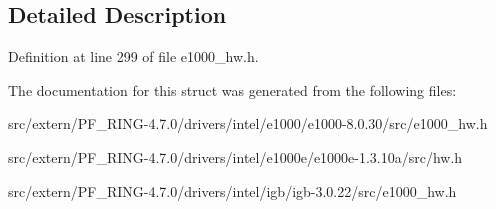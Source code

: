 

\subsection{Detailed Description}


Definition at line 299 of file e1000\_\-hw.h.



The documentation for this struct was generated from the following files:\begin{DoxyCompactItemize}
\item 
src/extern/PF\_\-RING-\/4.7.0/drivers/intel/e1000/e1000-\/8.0.30/src/e1000\_\-hw.h\item 
src/extern/PF\_\-RING-\/4.7.0/drivers/intel/e1000e/e1000e-\/1.3.10a/src/hw.h\item 
src/extern/PF\_\-RING-\/4.7.0/drivers/intel/igb/igb-\/3.0.22/src/e1000\_\-hw.h\end{DoxyCompactItemize}
